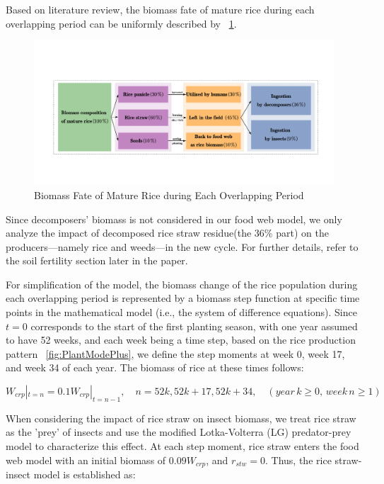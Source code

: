\documentclass{HZNUMCM}
\begin{document}
          Based on literature review\cite{OLIVER20191139,summers2003biomass}, 
          the biomass fate of mature rice during each overlapping period can be uniformly described by \figurename~\ref{fig:rice_to}. 
          \begin{figure}[H]
            \centering
            \includegraphics[width=\linewidth]{images/rice_to.pdf}
            \caption{Biomass Fate of Mature Rice during Each Overlapping Period}
            \label{fig:rice_to}
          \end{figure}
          Since decomposers' biomass is not considered in our food web model, 
          we only analyze the impact of decomposed rice straw residue(the 36\% part) on the producers—namely rice and weeds—in the new cycle. 
          For further details, refer to the soil fertility section later in the paper.
        
          For simplification of the model, 
          the biomass change of the rice population during each overlapping period is represented 
          by a biomass step function at specific time points in the mathematical model (i.e., the system of difference equations). 
          Since $t=0$ corresponds to the start of the first planting season, with one year assumed to have 52 weeks, 
          and each week being a time step, based on the rice production pattern \figurename~\ref{fig:PlantModePlus}, 
          we define the step moments at week 0, week 17, and week 34 of each year. The biomass of rice at these times follows:
        
          \begin{equation}
          W_{crp}|_{t=n}=0.1W_{crp}|_{t=n-1}, \quad n = 52k, 52k+17, 52k+34, \quad (year\, k \geqslant 0, \, week\, n \geqslant 1)
          \end{equation}
        
          When considering the impact of rice straw on insect biomass, 
          we treat rice straw as the 'prey' of insects and use the modified Lotka-Volterra (LG) predator-prey model to characterize this effect. 
          At each step moment, rice straw enters the food web model with an initial biomass of $0.09W_{crp}$, and $r_{stw} = 0$. 
          Thus, the rice straw-insect model is established as:
          
\end{document}

